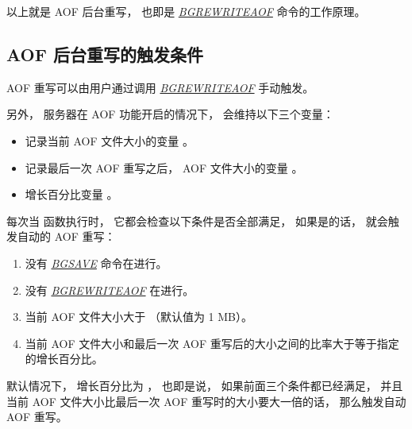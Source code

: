 \documentclass[a4paper,11pt,english]{sphinxmanual}
\begin{document}
以上就是 AOF 后台重写，
也即是 \href{http://redis.readthedocs.org/en/latest/server/bgrewriteaof.html\#bgrewriteaof}{\emph{BGREWRITEAOF}} 命令的工作原理。


\subsection{AOF 后台重写的触发条件}
\label{internal/aof:id14}
AOF 重写可以由用户通过调用 \href{http://redis.readthedocs.org/en/latest/server/bgrewriteaof.html\#bgrewriteaof}{\emph{BGREWRITEAOF}} 手动触发。

另外，
服务器在 AOF 功能开启的情况下，
会维持以下三个变量：
\begin{itemize}
\item {} 
记录当前 AOF 文件大小的变量  。

\item {} 
记录最后一次 AOF 重写之后， AOF 文件大小的变量  。

\item {} 
增长百分比变量  。

\end{itemize}

每次当  函数执行时，
它都会检查以下条件是否全部满足，
如果是的话，
就会触发自动的 AOF 重写：
\begin{enumerate}
\item {} 
没有 \href{http://redis.readthedocs.org/en/latest/server/bgsave.html\#bgsave}{\emph{BGSAVE}} 命令在进行。

\item {} 
没有 \href{http://redis.readthedocs.org/en/latest/server/bgrewriteaof.html\#bgrewriteaof}{\emph{BGREWRITEAOF}} 在进行。

\item {} 
当前 AOF 文件大小大于  （默认值为 1 MB）。

\item {} 
当前 AOF 文件大小和最后一次 AOF 重写后的大小之间的比率大于等于指定的增长百分比。

\end{enumerate}

默认情况下，
增长百分比为  ，
也即是说，
如果前面三个条件都已经满足，
并且当前 AOF 文件大小比最后一次 AOF 重写时的大小要大一倍的话，
那么触发自动 AOF 重写。
\end{document}
